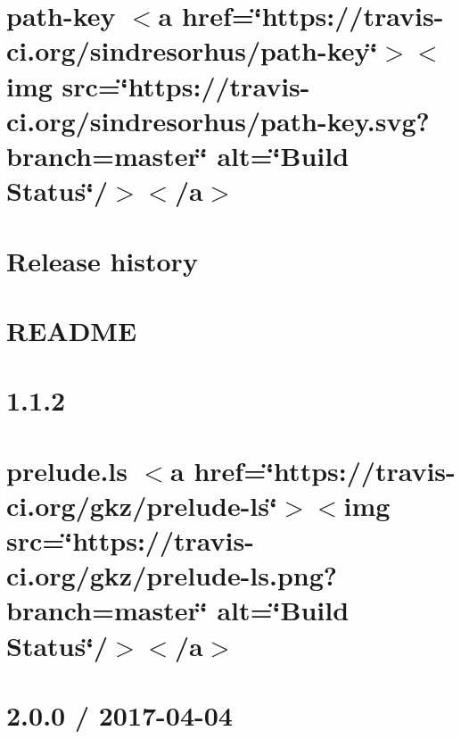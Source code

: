 \let\mypdfximage\pdfximage\def\pdfximage{\immediate\mypdfximage}\documentclass[twoside]{book}
\newcommand{\+}{\discretionary{\mbox{\scriptsize$\hookleftarrow$}}{}{}}
\begin{document}
\chapter{path-\/key $<$a href=\char`\"{}https\+://travis-\/ci.\+org/sindresorhus/path-\/key\char`\"{}$>$$<$img src=\char`\"{}https\+://travis-\/ci.\+org/sindresorhus/path-\/key.\+svg?branch=master\char`\"{} alt=\char`\"{}\+Build Status\char`\"{}/$>$$<$/a$>$}
\label{md_heap-visualizer_node_modules_path-key_readme}

\chapter{Release history}
\label{md_heap-visualizer_node_modules_picomatch__c_h_a_n_g_e_l_o_g}

\chapter{R\+E\+A\+D\+ME}
\label{md_heap-visualizer_node_modules_picomatch__r_e_a_d_m_e}

\chapter{1.1.2}
\label{md_heap-visualizer_node_modules_prelude-ls__c_h_a_n_g_e_l_o_g}

\chapter{prelude.\+ls $<$a href=\char`\"{}https\+://travis-\/ci.\+org/gkz/prelude-\/ls\char`\"{}$>$$<$img src=\char`\"{}https\+://travis-\/ci.\+org/gkz/prelude-\/ls.\+png?branch=master\char`\"{} alt=\char`\"{}\+Build Status\char`\"{}/$>$$<$/a$>$}
\label{md_heap-visualizer_node_modules_prelude-ls__r_e_a_d_m_e}

\chapter{2.0.0 / 2017-\/04-\/04}
\label{md_heap-visualizer_node_modules_progress__c_h_a_n_g_e_l_o_g}

\end{document}
